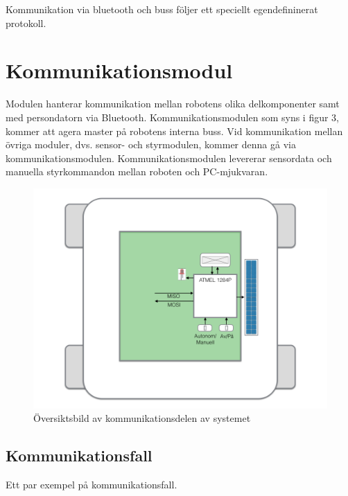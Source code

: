 \documentclass[a4paper,12pt,fleqn]{article}
\begin{document}
Kommunikation via bluetooth och buss följer ett speciellt egendefininerat protokoll. 



\section{Kommunikationsmodul}
Modulen hanterar kommunikation mellan robotens olika delkomponenter samt med persondatorn via Bluetooth. Kommunikationsmodulen som syns i figur 3, kommer att agera master på robotens interna buss. Vid kommunikation mellan övriga moduler, dvs. sensor- och styrmodulen, kommer denna gå via kommunikationsmodulen. Kommunikationsmodulen levererar sensordata och manuella styrkommandon mellan roboten och PC-mjukvaran.

\begin{figure}[htp] %
  \begin{center}
  \includegraphics[keepaspectratio=true,width=\linewidth]{bilder/kom_overview.png}  %
  \end{center}
  \caption{Översiktsbild av kommunikationsdelen av systemet} %
  \label{fig:overviewKom}
\end{figure}
\newpage
\subsection{Kommunikationsfall}
Ett par exempel på kom\-mun\-ikations\-fall.
\end{document}
